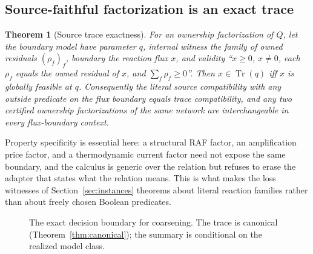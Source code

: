 \documentclass[11pt,a4paper]{article}
\theoremstyle{plain}
\newtheorem{theorem}{Theorem}[section]
\theoremstyle{definition}
\theoremstyle{remark}
\newcommand{\Tr}{\operatorname{Tr}}
\begin{document}
\subsection{Source-faithful factorization is an exact trace}

\begin{theorem}[Source trace exactness]\label{thm:source-trace}
For an ownership factorization of $Q$, let the boundary model have parameter $q$, internal witness the family of owned residuals $(\rho_f)_f$, boundary the reaction flux $x$, and validity ``$x\ge 0$, $x\ne 0$, each $\rho_f$ equals the owned residual of $x$, and $\sum_f\rho_f\ge 0$''. Then $x\in\Tr(q)$ iff $x$ is globally feasible at $q$. Consequently the literal source compatibility with any outside predicate on the flux boundary equals trace compatibility, and any two certified ownership factorizations of the same network are interchangeable in every flux-boundary context.
\end{theorem}

Property specificity is essential here: a structural RAF factor, an amplification price factor, and a thermodynamic current factor need not expose the same boundary, and the calculus is generic over the relation but refuses to erase the adapter that states what the relation means. This is what makes the loss witnesses of Section~\ref{sec:instances} theorems about literal reaction families rather than about freely chosen Boolean predicates.

\begin{figure}[t]
\centering
{}
\caption{The exact decision boundary for coarsening. The trace is canonical (Theorem~\ref{thm:canonical}); the summary is conditional on the realized model class.}
\label{fig:pipeline}
\end{figure}
\end{document}
